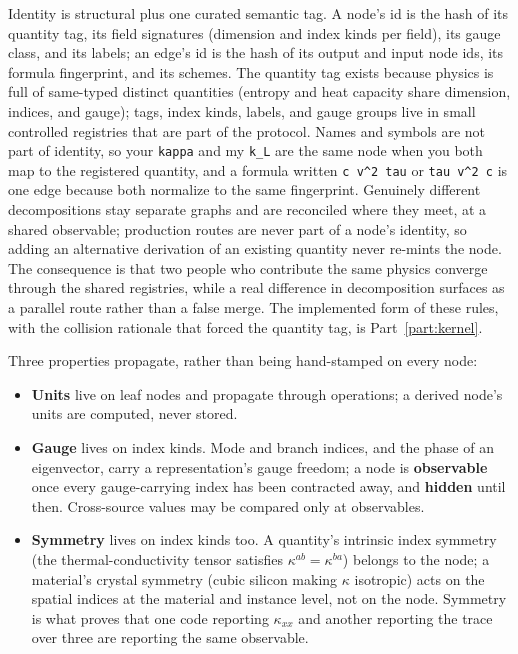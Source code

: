 \documentclass[11pt,a4paper]{article}
\begin{document}
Identity is structural plus one curated semantic tag. A node's id is the hash
of its quantity tag, its field signatures (dimension and index kinds per
field), its gauge class, and its labels; an edge's id is the hash of its output
and input node ids, its formula fingerprint, and its schemes. The quantity tag
exists because physics is full of same-typed distinct quantities (entropy and
heat capacity share dimension, indices, and gauge); tags, index kinds, labels,
and gauge groups live in small controlled registries that are part of the
protocol. Names and symbols are not part of identity, so your \texttt{kappa} and my
\texttt{k\_L} are the same node when you both map to the registered quantity, and a
formula written \texttt{c v\^{}2 tau} or \texttt{tau v\^{}2 c} is one edge because both normalize
to the same fingerprint. Genuinely different decompositions stay separate
graphs and are reconciled where they meet, at a shared observable; production
routes are never part of a node's identity, so adding an alternative
derivation of an existing quantity never re-mints the node. The consequence is
that two people who contribute the same physics converge through the shared
registries, while a real difference in decomposition surfaces as a parallel
route rather than a false merge. The implemented form of these rules, with the
collision rationale that forced the quantity tag, is Part~\ref{part:kernel}.

Three properties propagate, rather than being hand-stamped on every node:

\begin{itemize}[leftmargin=2em]
  \item \textbf{Units} live on leaf nodes and propagate through operations; a derived
  node's units are computed, never stored.
  \item \textbf{Gauge} lives on index kinds. Mode and branch indices, and the phase of an
  eigenvector, carry a representation's gauge freedom; a node is \textbf{observable}
  once every gauge-carrying index has been contracted away, and \textbf{hidden}
  until then. Cross-source values may be compared only at observables.
  \item \textbf{Symmetry} lives on index kinds too. A quantity's intrinsic index symmetry
  (the thermal-conductivity tensor satisfies $\kappa^{ab} = \kappa^{ba}$) belongs to
  the node; a material's crystal symmetry (cubic silicon making $\kappa$ isotropic)
  acts on the spatial indices at the material and instance level, not on the
  node. Symmetry is what proves that one code reporting $\kappa_{xx}$ and another
  reporting the trace over three are reporting the same observable.
\end{itemize}
\end{document}
